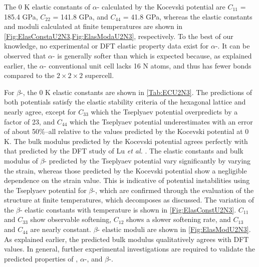 \documentclass[preprint, 12pt]{elsarticle}
\begin{document}
The 0 K elastic constants of $\alpha$- calculated by the Kocevski potential are $C_{11}$ = 185.4 GPa, $C_{22}$ = 141.8 GPa, and $C_{44}$ = 41.8 GPa, whereas the elastic constants and moduli calculated at finite temperatures are shown in \cref{Fig:ElasConstaU2N3,Fig:ElasModaU2N3}, respectively. To the best of our knowledge, no experimental or DFT elastic property data exist for $\alpha$-. It can be observed that $\alpha$- is generally softer than  which is expected because, as explained earlier, the $\alpha$- conventional unit cell lacks 16 N atoms, and thus has fewer bonds compared to the $2 \times 2 \times 2$  supercell.

For $\beta$-, the 0 K elastic constants are shown in \cref{Tab:ECU2N3}. The predictions of both potentials satisfy the elastic stability criteria of the hexagonal lattice and nearly agree, except for $C_{33}$ which the Tseplyaev potential overpredicts by a factor of 23, and $C_{44}$ which the Tseplyaev potential underestimates with an error of about 50\%--all relative to the values predicted by the Kocevski potential at 0 K. The bulk modulus predicted by the Kocevski potential agrees perfectly with that predicted by the DFT study of Lu \textit{et al.} \cite{Lu2011}. The elastic constants and bulk modulus of $\beta$- predicted by the Tseplyaev potential vary significantly by varying the strain, whereas those predicted by the Kocevski potential show a negligible dependence on the strain value. This is indicative of potential instabilities using the Tseplyaev potential for $\beta$-, which are confirmed through the evaluation of the structure at finite temperatures, which decomposes as discussed. The variation of the $\beta$- elastic constants with temperature is shown in \cref{Fig:ElasConstU2N3}. $C_{11}$ and $C_{33}$ show observable softening, $C_{12}$ shows a slower softening rate, and $C_{13}$ and $C_{44}$ are nearly constant. $\beta$- elastic moduli are shown in \cref{Fig:ElasModU2N3}. As explained earlier, the predicted bulk modulus qualitatively agrees with DFT values. In general, further experimental investigations are required to validate the predicted properties of , $\alpha$-, and $\beta$-.
\end{document}
